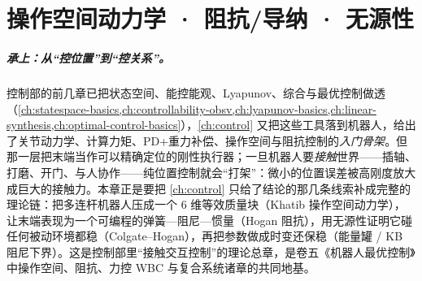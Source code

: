 \chapter{操作空间动力学 · 阻抗/导纳 · 无源性}
\label{ch:operational-space}


\paragraph{承上：从“控位置”到“控关系”。}
控制部的前几章已把状态空间、能控能观、Lyapunov、综合与最优控制做透（\cref{ch:statespace-basics,ch:controllability-obsv,ch:lyapunov-basics,ch:linear-synthesis,ch:optimal-control-basics}），\cref{ch:control} 又把这些工具落到机器人，给出了关节动力学、计算力矩、PD+重力补偿、操作空间与阻抗控制的\emph{入门骨架}。但那一层把末端当作可以精确定位的刚性执行器；一旦机器人要\emph{接触}世界——插轴、打磨、开门、与人协作——纯位置控制就会“打架”：微小的位置误差被高刚度放大成巨大的接触力。本章正是要把 \cref{ch:control} 只给了结论的那几条线索补成完整的理论链：把多连杆机器人压成一个 6 维等效质量块（Khatib 操作空间动力学），让末端表现为一个可编程的弹簧—阻尼—惯量（Hogan 阻抗），用无源性证明它碰任何被动环境都稳（Colgate--Hogan），再把参数做成时变还保稳（能量罐 / KB 阻尼下界）。这是控制部里“接触交互控制”的理论总章，是卷五《机器人最优控制》中操作空间、阻抗、力控 WBC 与复合系统诸章的共同地基。

